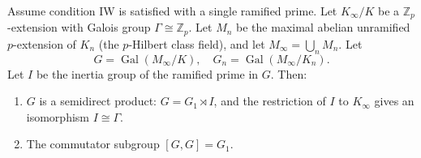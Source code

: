 Assume condition IW is satisfied with a single ramified prime. Let $K_{\infty}/K$ be a $\mathbb{Z}_p$-extension with Galois group $\Gamma \cong \mathbb{Z}_p$. Let $M_n$ be the maximal abelian unramified $p$-extension of $K_n$ (the $p$-Hilbert class field), and let $M_{\infty} = \bigcup_n M_n$. Let
$$G = \operatorname{Gal}(M_{\infty}/K), \quad G_n = \operatorname{Gal}(M_{\infty}/K_n).$$
Let $I$ be the inertia group of the ramified prime in $G$. Then:
\begin{enumerate}
\item[(i)] $G$ is a semidirect product: $G = G_1 \rtimes I$, and the restriction of $I$ to $K_{\infty}$ gives an isomorphism $I \cong \Gamma$.
\item[(ii)] The commutator subgroup $[G, G] = G_1$.
\end{enumerate}
